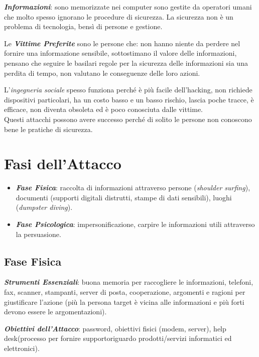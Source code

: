 \documentclass[a4paper, notitlepage, 9pt]{extreport}
\begin{document}
\noindent
\textit{\textbf{Informazioni}}: sono memorizzate nei computer sono gestite da operatori umani che molto spesso ignorano le procedure di sicurezza. La sicurezza non è un problema di tecnologia, bensì di persone e gestione.

\noindent
Le \textit{\textbf{Vittime Preferite}} sono le persone che: non hanno niente da perdere nel fornire una informazione sensibile, sottostimano il valore delle informazioni, pensano che seguire le basilari regole per la sicurezza delle informazioni sia una perdita di tempo, non valutano le conseguenze delle loro azioni.
\newline

\noindent
L'\textit{ingegneria sociale} spesso funziona perché è più facile dell'hacking, non richiede dispositivi particolari, ha un costo basso e un basso rischio, lascia poche tracce, è efficace, non diventa obsoleta ed è poco conosciuta dalle vittime.\\
Questi attacchi possono avere successo perché di solito le persone non conoscono bene le pratiche di sicurezza.

\section*{Fasi dell'Attacco}
\begin{itemize}
	\item \textit{\textbf{Fase Fisica}}: raccolta di informazioni attraverso persone (\textit{shoulder surfing}), documenti (supporti digitali distrutti, stampe di dati sensibili), luoghi (\textit{dumpster diving}).
	\item \textit{\textbf{Fase Psicologica}}: impersonificazione, carpire le informazioni utili attraverso la persuasione.
\end{itemize}

\subsection*{Fase Fisica}
\textit{\textbf{Strumenti Essenziali}}: buona memoria per raccogliere le informazioni, telefoni, fax, scanner, stampanti, server di posta, cooperazione, argomenti e ragioni per giustificare l'azione (più la persona target è vicina alle informazioni e più forti devono essere le argomentazioni).

\noindent
\textit{\textbf{Obiettivi dell'Attacco}}: password, obiettivi fisici (modem, server), help desk(processo per fornire supportoriguardo prodotti/servizi informatici ed elettronici).
\end{document}
